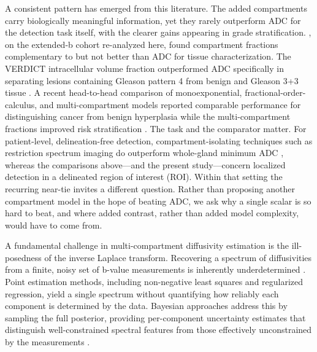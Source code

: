 A consistent pattern has emerged from this literature. The added compartments carry biologically meaningful information, yet they rarely outperform ADC for the detection task itself, with the clearer gains appearing in grade stratification.
\citet{langkilde2018evaluation}, on the extended-b cohort re-analyzed here, found compartment fractions complementary to but not better than ADC for tissue characterization. The VERDICT intracellular volume fraction outperformed ADC specifically in separating lesions containing Gleason pattern 4 from benign and Gleason 3+3 tissue \citep{johnston2019verdict}. A recent head-to-head comparison of monoexponential, fractional-order-calculus, and multi-compartment models reported comparable performance for distinguishing cancer from benign hyperplasia while the multi-compartment fractions improved risk stratification \citep{he2025improved}.
The task and the comparator matter. For patient-level, delineation-free detection, compartment-isolating techniques such as restriction spectrum imaging do outperform whole-gland minimum ADC \citep{domingo2025restriction}, whereas the comparisons above---and the present study---concern localized detection in a delineated region of interest (ROI).
Within that setting the recurring near-tie invites a different question. Rather than proposing another compartment model in the hope of beating ADC, we ask why a single scalar is so hard to beat, and where added contrast, rather than added model complexity, would have to come from.

A fundamental challenge in multi-compartment diffusivity estimation is the ill-posedness of the inverse Laplace transform. Recovering a spectrum of diffusivities from a finite, noisy set of b-value measurements is inherently underdetermined \citep{prange2009quantifying}.
Point estimation methods, including non-negative least squares and regularized regression, yield a single spectrum without quantifying how reliably each component is determined by the data. Bayesian approaches address this by sampling the full posterior, providing per-component uncertainty estimates that distinguish well-constrained spectral features from those effectively unconstrained by the measurements \citep{prange2009quantifying}.

